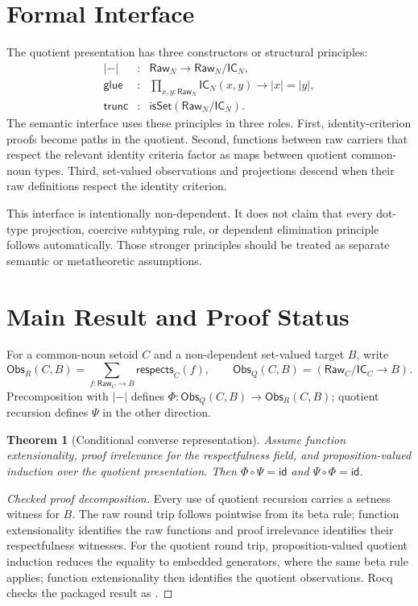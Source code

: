 \documentclass[11pt]{article}
\newcommand{\Raw}{\mathsf{Raw}}
\newcommand{\IC}{\mathsf{IC}}
\newcommand{\Quot}[2]{#1/{#2}}
\newcommand{\embed}[1]{\lvert #1\rvert}
\newtheorem{theorem}{Theorem}
\begin{document}
\section{Formal Interface}

The quotient presentation has three constructors or structural principles:
\[
\begin{array}{rcl}
  \embed{-} &:& \Raw_N \to \Quot{\Raw_N}{\IC_N},\\
  \mathsf{glue} &:&
    \prod_{x,y:\Raw_N}\IC_N(x,y)\to \embed{x}=\embed{y},\\
  \mathsf{trunc} &:& \mathsf{isSet}(\Quot{\Raw_N}{\IC_N}).
\end{array}
\]
The semantic interface uses these principles in three roles.  First,
identity-criterion proofs become paths in the quotient.  Second, functions
between raw carriers that respect the relevant identity criteria factor as
maps between quotient common-noun types.  Third, set-valued observations and
projections descend when their raw definitions respect the identity criterion.

This interface is intentionally non-dependent.  It does not claim that every
dot-type projection, coercive subtyping rule, or dependent elimination
principle follows automatically.  Those stronger principles should be treated
as separate semantic or metatheoretic assumptions.

\section{Main Result and Proof Status}

For a common-noun setoid $C$ and a non-dependent set-valued target $B$, write
\[
  \mathsf{Obs}_{R}(C,B)
    = \sum_{f:\Raw_C\to B}\mathsf{respects}_C(f),
  \qquad
  \mathsf{Obs}_{Q}(C,B) = (\Quot{\Raw_C}{\IC_C}\to B).
\]
Precomposition with $\embed{-}$ defines
$\Phi:\mathsf{Obs}_{Q}(C,B)\to\mathsf{Obs}_{R}(C,B)$; quotient recursion
defines $\Psi$ in the other direction.

\begin{theorem}[Conditional converse representation]
Assume function extensionality, proof irrelevance for the respectfulness
field, and proposition-valued induction over the quotient presentation.
Then $\Phi\circ\Psi=\mathsf{id}$ and
$\Psi\circ\Phi=\mathsf{id}$.
\end{theorem}

\begin{proof}[Checked proof decomposition]
Every use of quotient recursion carries a setness witness for $B$.  The raw round trip follows pointwise from its beta rule;
function extensionality identifies the raw functions and proof irrelevance
identifies their respectfulness witnesses.  For the quotient round trip,
proposition-valued quotient induction reduces the equality to embedded
generators, where the same beta rule applies; function extensionality then
identifies the quotient observations.  Rocq checks the packaged result as
.
\end{proof}
\end{document}
